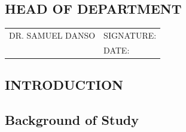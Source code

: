 \documentclass[a4paper,12pt]{article}  %
\begin{document}
\vspace{1cm}

\subsection*{HEAD OF DEPARTMENT}
\begin{tabular}{l l}
      \vspace{1cm}
      DR. SAMUEL DANSO & SIGNATURE: \underline{\hspace{5cm}} \\
                       & DATE: \underline{\hspace{5cm}}      \\
\end{tabular}
\newpage
\tableofcontents
\newpage
\begin{center}
\section{INTRODUCTION}
\end{center}
\subsection{Background of Study}
\end{document}
